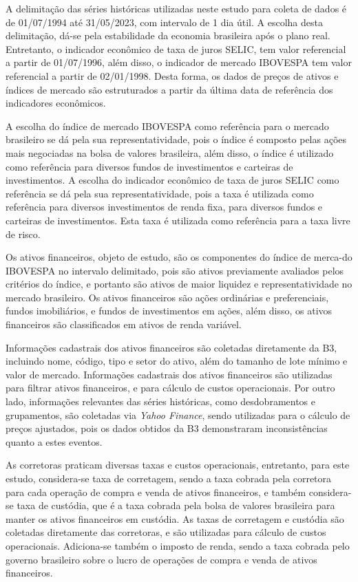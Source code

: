         \ipar A delimitação das séries históricas utilizadas neste estudo para coleta de dados é de 01/07/1994 até 31/05/2023, com intervalo de 1 dia útil. A escolha desta delimitação, dá-se pela estabilidade da economia brasileira após o plano real. Entretanto, o indicador econômico de taxa de juros SELIC, tem valor referencial a partir de 01/07/1996, além disso, o indicador de mercado \acrshort{IBOVESPA} tem valor referencial a partir de 02/01/1998. Desta forma, os dados de preços de ativos e índices de mercado são estruturados a partir da última data de referência dos indicadores econômicos.

        \ipar A escolha do índice de mercado \acrshort{IBOVESPA} como referência para o mercado brasileiro se dá pela sua representatividade, pois o índice é composto pelas ações mais negociadas na bolsa de valores brasileira, além disso, o índice é utilizado como referência para diversos fundos de investimentos e carteiras de investimentos. A escolha do indicador econômico de taxa de juros SELIC como referência se dá pela sua representatividade, pois a taxa é utilizada como referência para diversos investimentos de renda fixa, para diversos fundos e carteiras de investimentos. Esta taxa é utilizada como referência para a taxa livre de risco.

        \ipar Os ativos financeiros, objeto de estudo, são os componentes do índice de merca-do \acrshort{IBOVESPA} no intervalo delimitado, pois são ativos previamente avaliados pelos critérios do índice, e portanto são ativos de maior liquidez e representatividade no mercado brasileiro. Os ativos financeiros são ações ordinárias e preferenciais, fundos imobiliários, e fundos de investimentos em ações, além disso, os ativos financeiros são classificados em ativos de renda variável.

        \ipar Informações cadastrais dos ativos financeiros são coletadas diretamente da B3, incluindo nome, código, tipo e setor do ativo, além do tamanho de lote mínimo e valor de mercado. Informações cadastrais dos ativos financeiros são utilizadas para filtrar ativos financeiros, e para cálculo de custos operacionais. Por outro lado, informações relevantes das séries históricas, como desdobramentos e grupamentos, são coletadas via \textit{Yahoo Finance}, sendo utilizadas para o cálculo de preços ajustados, pois os dados obtidos da B3 demonstraram inconsistências quanto a estes eventos.

        \ipar As corretoras praticam diversas taxas e custos operacionais, entretanto, para este estudo, considera-se taxa de corretagem, sendo a taxa cobrada pela corretora para cada operação de compra e venda de ativos financeiros, e também considera-se taxa de custódia, que é a taxa cobrada pela bolsa de valores brasileira para manter os ativos financeiros em custódia. As taxas de corretagem e custódia são coletadas diretamente das corretoras, e são utilizadas para cálculo de custos operacionais. Adiciona-se também o imposto de renda, sendo a taxa cobrada pelo governo brasileiro sobre o lucro de operações de compra e venda de ativos financeiros.

